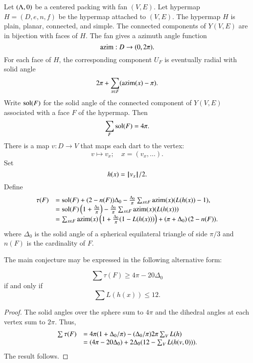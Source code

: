 {Let $(\Lambda,0)$ be a centered packing with
fan $(V,E)$.  Let  hypermap $H=(D,e,n,f)$
be the hypermap attached to $(V,E)$.
The hypermap $H$ is plain, planar, connected, and simple.
The connected components of $Y(V,E)$ are in bijection with
faces of $H$.  
The fan gives a azimuth angle function
$$
{\operatorname{azim}} : D \to (0,2\pi).
$$
For each face of $H$, the corresponding component $U_F$
is eventually radial with solid
angle
  $$
  2\pi + \sum_{x\in F} ({\operatorname{azim}}(x) -\pi).
  $$
Write $\operatorname{sol}(F)$ for the solid angle of the connected component
of $Y(V,E)$ associated with a face $F$ of the hypermap.
Then
    $$\sum_{F} \operatorname{sol}(F) = 4\pi.$$
There is a map $v:D\to V$ that maps each dart to the vertex:
$$
v \mapsto v_x; \quad   x = (v_x,\ldots).
$$
Set 
$$h(x) = {{\hskip0.1em|\hskip-0.15em|\hskip0.1em}v_x{\hskip0.1em|\hskip-0.15em|\hskip0.1em}}/2.$$
Define
\begin{equation}
\begin{array}{lll}
\tau(F) &= \operatorname{sol}(F) + (2- n(F))\Delta_0 - \frac{\Delta_0}{\pi}\sum_{x\in F}{\operatorname{azim}}(x) (L(h(x)) - 1),\\
  &= \operatorname{sol}(F) \left( 1 + \frac{\Delta_0}{\pi}\right) - \frac{\Delta_0}{\pi} \sum_{x\in F} {\operatorname{azim}}(x)(L(h(x)))\\
  &=\sum_{x\in F} {\operatorname{azim}}(x)\left(1 + \frac{\Delta_0}{\pi}(1- L(h(x)))\right) + \left(\pi+{\Delta_0}\right) (2- n(F)).
\end{array}
\end{equation}
where $\Delta_0$ is the solid angle of a spherical equilateral triangle of side $\pi/3$ and $n(F)$ is the cardinality of $F$.

The main conjecture may be expressed in the following alternative form:

\begin{lemma}
$$
\sum \tau (F) \ge 4\pi - 20\Delta_0
$$
if and only if
$$
\sum L(h(x)) \le 12.
$$
\end{lemma}

\begin{proof}
The solid angles over the sphere sum to $4\pi$ and the dihedral angles at each vertex sum to $2\pi$. 
Thus,
\begin{equation}\label{eqn:delta0}
\begin{array}{lll}
\sum \tau (F) 
&= 4\pi (1 + \Delta_0/\pi) - (\Delta_0/\pi) 2\pi \sum_{V} L(h)\\

&= (4\pi - 20\Delta_0) + 2\Delta_0 (12 - \sum_V L(h(v,0))).
\end{array}
\end{equation}
The result follows.
\end{proof}

}
